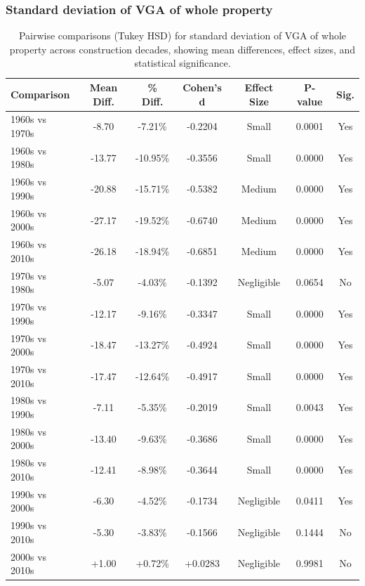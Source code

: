 \subsubsection{Standard deviation of VGA of whole property}
\begin{table}[htbp]
    \centering
    \begin{tabular}{l|c|c|c|c|c|c}
    \hline
    \textbf{Comparison} & \textbf{Mean Diff.} & \textbf{\% Diff.} & \textbf{Cohen's d} & \textbf{Effect Size} & \textbf{P-value} & \textbf{Sig.} \\
    \hline
    1960s vs 1970s & -8.70 & -7.21\% & -0.2204 & Small & 0.0001 & Yes \\
    1960s vs 1980s & -13.77 & -10.95\% & -0.3556 & Small & 0.0000 & Yes \\
    1960s vs 1990s & -20.88 & -15.71\% & -0.5382 & Medium & 0.0000 & Yes \\
    1960s vs 2000s & -27.17 & -19.52\% & -0.6740 & Medium & 0.0000 & Yes \\
    1960s vs 2010s & -26.18 & -18.94\% & -0.6851 & Medium & 0.0000 & Yes \\
    1970s vs 1980s & -5.07 & -4.03\% & -0.1392 & Negligible & 0.0654 & No \\
    1970s vs 1990s & -12.17 & -9.16\% & -0.3347 & Small & 0.0000 & Yes \\
    1970s vs 2000s & -18.47 & -13.27\% & -0.4924 & Small & 0.0000 & Yes \\
    1970s vs 2010s & -17.47 & -12.64\% & -0.4917 & Small & 0.0000 & Yes \\
    1980s vs 1990s & -7.11 & -5.35\% & -0.2019 & Small & 0.0043 & Yes \\
    1980s vs 2000s & -13.40 & -9.63\% & -0.3686 & Small & 0.0000 & Yes \\
    1980s vs 2010s & -12.41 & -8.98\% & -0.3644 & Small & 0.0000 & Yes \\
    1990s vs 2000s & -6.30 & -4.52\% & -0.1734 & Negligible & 0.0411 & Yes \\
    1990s vs 2010s & -5.30 & -3.83\% & -0.1566 & Negligible & 0.1444 & No \\
    2000s vs 2010s & +1.00 & +0.72\% & +0.0283 & Negligible & 0.9981 & No \\
    \hline
    \end{tabular}
    \caption{Pairwise comparisons (Tukey HSD) for standard deviation of VGA of whole property across construction decades, showing mean differences, effect sizes, and statistical significance.}
    \label{tab:std_vga_tukey_hsd}
\end{table}

